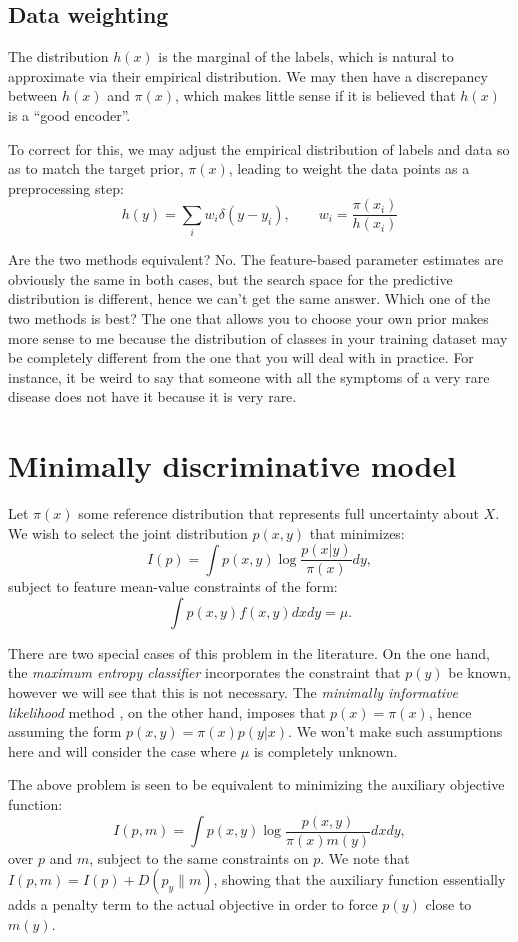 \documentclass[english]{scrartcl}
\begin{document}
\subsection{Data weighting}

The distribution $h(x)$ is the marginal of the labels, which is natural to approximate via their empirical distribution. We may then have a discrepancy between $h(x)$ and $\pi(x)$, which makes little sense if it is believed that $h(x)$ is a ``good encoder''. 

To correct for this, we may adjust the empirical distribution of labels and data so as to match the target prior, $\pi(x)$, leading to weight the data points as a preprocessing step:
$$
h(y) = \sum_i w_i \delta(y-y_i),
\qquad
w_i = \frac{\pi(x_i)}{h(x_i)}
$$

Are the two methods equivalent? No. The feature-based parameter estimates are obviously the same in both cases, but the search space for the predictive distribution is different, hence we can't get the same answer. Which one of the two methods is best? The one that allows you to choose your own prior makes more sense to me because the distribution of classes in your training dataset may be completely different from the one that you will deal with in practice. For instance, it be weird to say that someone with all the symptoms of a very rare disease does not have it because it is very rare. 


\section{Minimally discriminative model}

Let $\pi(x)$ some reference distribution that represents full
uncertainty about $X$. We wish to select the joint distribution
$p(x,y)$ that minimizes:
$$
I(p) = \int p(x,y) \log \frac{p(x|y)}{\pi(x)} dy,
$$ subject to feature mean-value constraints of the form:
$$
\int p(x,y) f(x,y) dx dy = \mu.
$$

There are two special cases of this problem in the literature.  On the
one hand, the {\em maximum entropy classifier} \cite{BergerA-96}
incorporates the constraint that $p(y)$ be known, however we will see
that this is not necessary. The {\em minimally informative likelihood}
method \cite{Yuan-99b,Yuan-99}, on the other hand, imposes that
$p(x)=\pi(x)$, hence assuming the form $p(x,y)=\pi(x)p(y|x)$. We won't
make such assumptions here and will consider the case where $\mu$ is
completely unknown.

The above problem is seen to be equivalent to minimizing the auxiliary
objective function:
$$
I(p,m) 
= \int p(x,y) \log \frac{p(x,y)}{\pi(x)m(y)} dxdy,
$$ over $p$ and $m$, subject to the same constraints on $p$. We note
that $I(p,m)=I(p)+D(p_y\|m)$, showing that the auxiliary function
essentially adds a penalty term to the actual objective in order to
force $p(y)$ close to $m(y)$.
\end{document}
